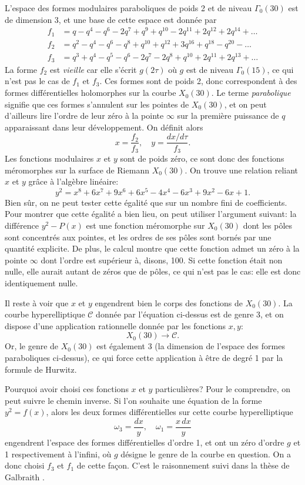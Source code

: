 \documentclass[11pt,a4paper]{article}
\newcommand{\Cl}{\mathcal{C}}
\newcommand{\vers}{\longrightarrow}
\theoremstyle{definition}
\begin{document}
L'espace des formes modulaires paraboliques de poids 2 et de niveau $\Gamma_0(30)$ est de dimension 3, et une base de cette espace est donnée par
$$\begin{aligned}
f_1 &= q - q^4 - q^6 - 2q^7 + q^9 + q^{10} - 2q^{11} + 2q^{12} + 2 q^{14} +\ldots\\
f_2 &= q^2 - q^4 - q^6 - q^8 + q^{10} + q^{12} + 3q^{16} + q^{18} - q^{20} - \ldots \\
f_3 &= q^3 + q^4 - q^5 - q^6 - 2q^7 - 2q^8 + q^{10} + 2q^{11} + 2q^{13} + \ldots
\end{aligned}$$
La forme $f_2$ est \emph{vieille} car elle s'écrit $g(2\tau)$ où $g$ est de niveau $\Gamma_0(15)$, ce qui n'est pas le cas de $f_1$ et $f_3$. Ces formes sont de poids 2, donc correspondent à des formes différentielles holomorphes sur la courbe $X_0(30)$. Le terme \emph{parabolique} signifie que ces formes s'annulent sur les pointes de $X_0(30)$, et on peut d'ailleurs lire l'ordre de leur zéro à la pointe $\infty$ sur la première puissance de $q$ apparaissant dans leur développement. On définit alors
$$ x = \frac{f_2}{f_3}, \quad y = \frac{dx/d\tau}{f_3}.$$
Les fonctions modulaires $x$ et $y$ sont de poids zéro, ce sont donc des fonctions méromorphes sur la surface de Riemann $X_0(30)$. On trouve une relation reliant $x$ et $y$ grâce à l'algèbre linéaire:
$$ y^2 =  x^8 + 6x^7 + 9x^6 + 6x^5 - 4x^4 - 6x^3 + 9x^2 - 6x +1. $$
Bien sûr, on ne peut tester cette égalité que sur un nombre fini de coefficients. Pour montrer que cette égalité a bien lieu, on peut utiliser l'argument suivant: la différence
$y^2 - P(x)$
est une fonction méromorphe sur $X_0(30)$ dont les pôles sont concentrés aux pointes, et les ordres de ses pôles sont bornés par une quantité explicite. De plus, le calcul montre que cette fonction admet un zéro à la pointe $\infty$ dont l'ordre est supérieur à, disons, 100. Si cette fonction était non nulle, elle aurait autant de zéros que de pôles, ce qui n'est pas le cas: elle est donc identiquement nulle.

Il reste à voir que $x$ et $y$ engendrent bien le corps des fonctions de $X_0(30)$. La courbe hyperelliptique $\Cl$ donnée par l'équation ci-dessus est de genre 3, et on dispose d'une application rationnelle donnée par les fonctions $x, y$:
$$X_0(30) \vers \Cl.$$
Or, le genre de $X_0(30)$ est également 3 (la dimension de l'espace des formes paraboliques ci-dessus), ce qui force cette application à être de degré 1 par la formule de Hurwitz.

Pourquoi avoir choisi ces fonctions $x$ et $y$ particulières? Pour le comprendre, on peut suivre le chemin inverse. Si l'on souhaite une équation de la forme $y^2 = f(x)$, alors les deux formes différentielles sur cette courbe hyperelliptique
$$\omega_3 =  \frac{dx}{y},\quad \omega_1 = \frac{x\, dx}{y}$$
engendrent l'espace des formes différentielles d'ordre 1, et ont un zéro d'ordre $g$ et 1 respectivement à l'infini, où $g$ désigne le genre de la courbe en question. On a donc choisi $f_3$ et $f_1$ de cette façon. C'est le raisonnement suivi dans la thèse de Galbraith \cite{Galbraith}.
\end{document}
